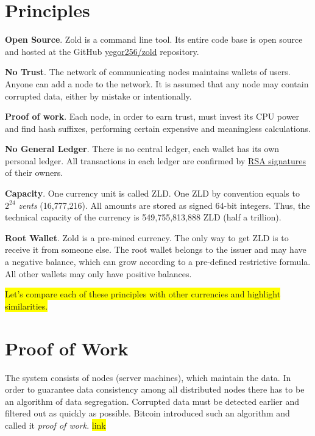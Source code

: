 \documentclass[11pt,oneside]{article}
\begin{document}
\section{Principles}

\textbf{Open Source}.
Zold is a command line tool. Its entire code base is open source
and hosted at the GitHub \href{https://github.com/yegor256/zold}{yegor256/zold}
repository.

\textbf{No Trust}.
The network of communicating nodes maintains wallets of users.
Anyone can add a node to the network.
It is assumed that any node may contain corrupted data, either by mistake or intentionally.

\textbf{Proof of work}.
Each node, in order to earn trust, must invest its CPU power
and find hash suffixes, performing certain expensive and meaningless calculations.

\textbf{No General Ledger}.
There is no central ledger, each wallet has its own personal ledger.
All transactions in each ledger are confirmed by
\href{https://en.wikipedia.org/wiki/RSA_(cryptosystem)}{RSA signatures}
of their owners.

\textbf{Capacity}.
One currency unit is called ZLD.
One ZLD by convention equals to $2^{24}$ \emph{zents} (16,777,216).
All amounts are stored as signed 64-bit integers.
Thus, the technical capacity of the currency is 549,755,813,888 ZLD (half a trillion).

\textbf{Root Wallet}.
Zold is a pre-mined currency.
The only way to get ZLD is to receive it from someone else.
The root wallet belongs to the issuer and may have a negative balance,
which can grow according to a pre-defined restrictive formula.
All other wallets may only have positive balances.

\colorbox{yellow}{Let's compare each of these principles with other currencies and highlight similarities.}

\section{Proof of Work}

The system consists of nodes (server machines), which maintain the data.
In order to guarantee data consistency among all distributed nodes
there has to be an algorithm of data segregation.
Corrupted data must be detected earlier and filtered out as quickly as possible.
Bitcoin introduced such an algorithm and called it \emph{proof of work}.
\colorbox{yellow}{link}
\end{document}
